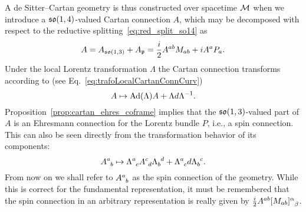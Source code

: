 \documentclass[
final,
11pt,
a4paper,
DIV=11,
headinclude=true,
footinclude=false,
bibliography=totoc,
twoside=true,  %
BCOR=5mm
]{scrbook}
\begin{document}
A de Sitter--Cartan geometry is thus constructed over spacetime 
$\mathcal{M}$ when we introduce a $\mathfrak{so}(1,4)$-valued Cartan 
connection $A$, which may be decomposed with respect to the 
reductive splitting~\eqref{eq:red_split_so14} as
\begin{equation}
\label{eq:CartConn_decomp}
  A = A_{\mathfrak{so}(1,3)} + A_\mathfrak{p}
  = \frac{i}{2} A^{ab} M_{ab} + i A^a P_a.
\end{equation}
Under the local Lorentz transformation $\Lambda$ the Cartan 
connection transforms according to (see 
Eq.~\eqref{eq:trafoLocalCartanConnCurv})
\begin{equation*}
  A \mapsto \operatorname{Ad}(\Lambda) A + \Lambda d\Lambda^{-1}.
\end{equation*}
Proposition~\ref{prop:cartan_ehres_coframe} implies that the
$\mathfrak{so}(1,3)$-valued part of $A$ is an Ehresmann connection for 
the Lorentz bundle $P$, i.e., a spin connection. This can also be 
seen directly from the transformation behavior of its components:  
\begin{equation*}
  A\ind{^a_b} \mapsto \Lambda\ind{^a_c} A\ind{^c_d} 
  \Lambda\ind{_b^d} + \Lambda\ind{^a_c} d\Lambda\ind{_b^c}.
\end{equation*}
From now on we shall refer to $A\ind{^a_b}$ as the spin 
connection of the geometry. While this is correct for the 
fundamental representation, it must be remembered that the spin 
connection in an arbitrary representation is really given by 
$\tfrac{i}{2} A^{ab} [M_{ab}]\ind{^\alpha_\beta}$.
\end{document}
